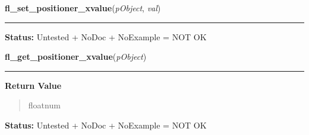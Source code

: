     \label{xformslib:library:fl_set_positioner_xvalue}

    \vspace{0.5ex}

\hspace{.8\funcindent}\begin{boxedminipage}{\funcwidth}

    \raggedright \textbf{fl\_set\_positioner\_xvalue}(\textit{pObject}, \textit{val})

    \vspace{-1.5ex}

    \rule{\textwidth}{0.5\fboxrule}
\setlength{\parskip}{2ex}
\setlength{\parskip}{1ex}
\textbf{Status:} Untested + NoDoc + NoExample = NOT OK



    \end{boxedminipage}

    \label{xformslib:library:fl_get_positioner_xvalue}

    \vspace{0.5ex}

\hspace{.8\funcindent}\begin{boxedminipage}{\funcwidth}

    \raggedright \textbf{fl\_get\_positioner\_xvalue}(\textit{pObject})

    \vspace{-1.5ex}

    \rule{\textwidth}{0.5\fboxrule}
\setlength{\parskip}{2ex}
\setlength{\parskip}{1ex}
      \textbf{Return Value}
    \vspace{-1ex}

      \begin{quote}
      floatnum

      \end{quote}

\textbf{Status:} Untested + NoDoc + NoExample = NOT OK



    \end{boxedminipage}

    \label{xformslib:library:fl_set_positioner_xbounds}

